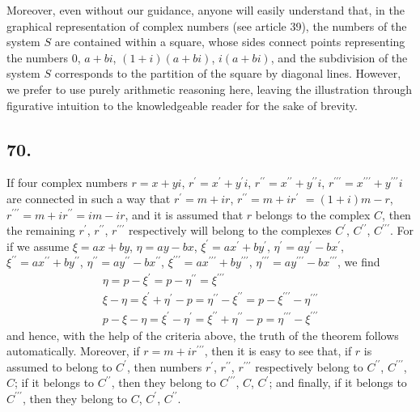 \documentclass[twoside,12pt]{memoir}
\begin{document}
Moreover, even without our guidance, anyone will easily understand that, in the graphical representation of complex numbers (see article 39), the numbers of the system \(S\) are contained within a square, whose sides connect points representing the numbers \(0\), \(a+b i\), \((1+i)(a+b i)\), \(i(a+b i)\), and the subdivision of the system \(S\) corresponds to the partition of the square by diagonal lines. However, we prefer to use purely arithmetic reasoning here, leaving the illustration through figurative intuition to the knowledgeable reader for the sake of brevity.

\subsection*{70.}

If four complex numbers \(r=x+yi\), \(r^{\prime}=x^{\prime}+y^{\prime}i\), \(r^{\prime \prime}=x^{\prime \prime}+y^{\prime \prime}i\), \(r^{\prime \prime \prime}=x^{\prime \prime \prime}+y^{\prime \prime \prime}i\) are connected in such a way that \(r^{\prime}=m+ir\), \(r^{\prime \prime}=m+ir^{\prime}\) \(=(1+i)m-r\), \(r^{\prime \prime \prime}=m+ir^{\prime \prime}=im-ir\), and it is assumed that \(r\) belongs to the complex \(C\), then the remaining \(r^{\prime}\), \(r^{\prime \prime}\), \(r^{\prime \prime \prime}\) respectively will belong to the complexes \(C^{\prime}\), \(C^{\prime \prime}\), \(C^{\prime
\prime \prime}\). For if we assume \(\xi=ax+by\), \(\eta=ay-bx\), \(\xi^{\prime}=ax^{\prime}+by^{\prime}\), \(\eta^{\prime}=ay^{\prime}-bx^{\prime}\), \(\xi^{\prime \prime}=ax^{\prime \prime}+by^{\prime \prime}\), \(\eta^{\prime \prime}=ay^{\prime \prime}-bx^{\prime \prime}\), \(\xi^{\prime \prime \prime}=ax^{\prime \prime \prime}+by^{\prime \prime \prime}\), \(\eta^{\prime \prime \prime}=ay^{\prime \prime \prime}-bx^{\prime \prime \prime}\), we find
\[\begin{gathered}
\eta=p-\xi^{\prime}=p-\eta^{\prime \prime}=\xi^{\prime \prime \prime} \\
\xi-\eta=\xi^{\prime}+\eta^{\prime}-p=\eta^{\prime \prime}-\xi^{\prime \prime}=p-\xi^{\prime \prime \prime}-\eta^{\prime \prime \prime} \\
p-\xi-\eta=\xi^{\prime}-\eta^{\prime}=\xi^{\prime \prime}+\eta^{\prime \prime}-p=\eta^{\prime \prime \prime}-\xi^{\prime \prime \prime}
\end{gathered}\]
and hence, with the help of the criteria above, the truth of the theorem follows automatically.  Moreover, if \(r=m+ir^{\prime \prime \prime}\), then it is easy to see that, if \(r\) is assumed to belong to \(C^{\prime}\), then numbers \(r^{\prime}\), \(r^{\prime \prime}\), \(r^{\prime \prime \prime}\) respectively belong to \(C^{\prime \prime}\), \(C^{\prime \prime \prime}\), \(C\); if it belongs to \(C^{\prime \prime}\), then they belong to \(C^{\prime \prime \prime}\), \(C\), \(C^{\prime}\); and finally, if it belongs to \(C^{\prime \prime \prime}\), then they belong to \(C\), \(C^{\prime}\), \(C^{\prime \prime}\).
\end{document}

